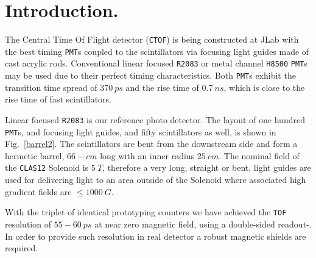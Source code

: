 \documentclass[12pt]{article}
\begin{document}
\section{Introduction.}
The Central Time Of Flight detector ({\tt CTOF}) is being constructed 
at JLab\cite{upgrade2} with 
the  best timing {\tt PMT}s coupled
to the scintillators via  focusing  light guides made of cast acrylic rods.
Conventional linear focused
{\tt R2083} or 
metal channel {\tt H8500} {\tt PMT}s may be  used due to 
their perfect timing characteristics.
Both {\tt PMT}s  exhibit the  transition time spread of $370~ps$ and  the   
rise time of $0.7~ns$, which is close to the rise time of fast scintillators.
  
Linear focused {\tt R2083} is our reference photo detector. 
The layout of one hundred  {\tt PMT}s, and  focusing light guides, and fifty
scintillators  as well,  is shown in Fig.~{\ref{barrel2}}.
The scintillators are  bent from the downstream side and  form a hermetic  barrel,
$66-cm$ long with an inner radius $25~cm$.
%
The nominal field of the {\tt CLAS12}  Solenoid  is $5~T$, therefore 
a very long, straight or  bent, light guides  are used  for  
delivering light to an area outside of the  Solenoid where 
associated high gradient fields  are $ \le1000~G$.

With the triplet of identical  prototyping counters   
we have achieved  the {\tt TOF} resolution of   
$55-60~ps$  at near zero magnetic field, 
using  a double-sided readout\cite{r1}-\cite{6percent}. 
In order to  provide such resolution in real detector 
a robust magnetic shields are required.
\end{document}

